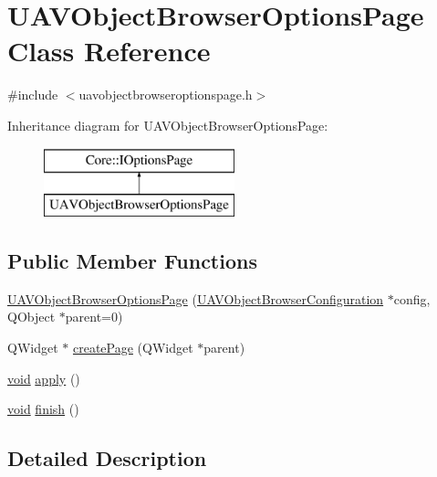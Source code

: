 \hypertarget{class_u_a_v_object_browser_options_page}{\section{\-U\-A\-V\-Object\-Browser\-Options\-Page \-Class \-Reference}
\label{class_u_a_v_object_browser_options_page}
}


{\ttfamily \#include $<$uavobjectbrowseroptionspage.\-h$>$}

\-Inheritance diagram for \-U\-A\-V\-Object\-Browser\-Options\-Page\-:\begin{figure}[H]
\begin{center}
\leavevmode
\includegraphics[height=2.000000cm]{class_u_a_v_object_browser_options_page}
\end{center}
\end{figure}
\subsection*{\-Public \-Member \-Functions}
\begin{DoxyCompactItemize}
\item 
\hyperlink{group___u_a_v_object_browser_plugin_gae101cd8e551d717a5421361feafa1cf0}{\-U\-A\-V\-Object\-Browser\-Options\-Page} (\hyperlink{class_u_a_v_object_browser_configuration}{\-U\-A\-V\-Object\-Browser\-Configuration} $\ast$config, \-Q\-Object $\ast$parent=0)
\item 
\-Q\-Widget $\ast$ \hyperlink{group___u_a_v_object_browser_plugin_gae567a8d4a9212e69b15f4cdb06c7ac09}{create\-Page} (\-Q\-Widget $\ast$parent)
\item 
\hyperlink{group___u_a_v_objects_plugin_ga444cf2ff3f0ecbe028adce838d373f5c}{void} \hyperlink{group___u_a_v_object_browser_plugin_ga13631605b54e41a066fa4f4d2472b072}{apply} ()
\item 
\hyperlink{group___u_a_v_objects_plugin_ga444cf2ff3f0ecbe028adce838d373f5c}{void} \hyperlink{group___u_a_v_object_browser_plugin_gabd2876750567bb091c8c009d2cca931f}{finish} ()
\end{DoxyCompactItemize}


\subsection{\-Detailed \-Description}


